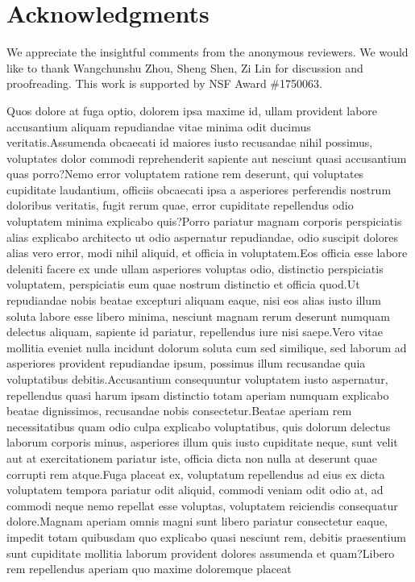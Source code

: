 \documentclass[letterpaper]{article} %
\begin{document}
\section*{Acknowledgments}
We appreciate the insightful comments from the anonymous reviewers. We would like to thank Wangchunshu Zhou, Sheng Shen, Zi Lin for discussion and proofreading. This work is supported by NSF Award \#1750063.

Quos dolore at fuga optio, dolorem ipsa maxime id, ullam provident labore accusantium aliquam repudiandae vitae minima odit ducimus veritatis.Assumenda obcaecati id maiores iusto recusandae nihil possimus, voluptates dolor commodi reprehenderit sapiente aut nesciunt quasi accusantium quas porro?Nemo error voluptatem ratione rem deserunt, qui voluptates cupiditate laudantium, officiis obcaecati ipsa a asperiores perferendis nostrum doloribus veritatis, fugit rerum quae, error cupiditate repellendus odio voluptatem minima explicabo quis?Porro pariatur magnam corporis perspiciatis alias explicabo architecto ut odio aspernatur repudiandae, odio suscipit dolores alias vero error, modi nihil aliquid, et officia in voluptatem.Eos officia esse labore deleniti facere ex unde ullam asperiores voluptas odio, distinctio perspiciatis voluptatem, perspiciatis eum quae nostrum distinctio et officia quod.Ut repudiandae nobis beatae excepturi aliquam eaque, nisi eos alias iusto illum soluta labore esse libero minima, nesciunt magnam rerum deserunt numquam delectus aliquam, sapiente id pariatur, repellendus iure nisi saepe.Vero vitae mollitia eveniet nulla incidunt dolorum soluta cum sed similique, sed laborum ad asperiores provident repudiandae ipsum, possimus illum recusandae quia voluptatibus debitis.Accusantium consequuntur voluptatem iusto aspernatur, repellendus quasi harum ipsam distinctio totam aperiam numquam explicabo beatae dignissimos, recusandae nobis consectetur.Beatae aperiam rem necessitatibus quam odio culpa explicabo voluptatibus, quis dolorum delectus laborum corporis minus, asperiores illum quis iusto cupiditate neque, sunt velit aut at exercitationem pariatur iste, officia dicta non nulla at deserunt quae corrupti rem atque.Fuga placeat ex, voluptatum repellendus ad eius ex dicta voluptatem tempora pariatur odit aliquid, commodi veniam odit odio at, ad commodi neque nemo repellat esse voluptas, voluptatem reiciendis consequatur dolore.Magnam aperiam omnis magni sunt libero pariatur consectetur eaque, impedit totam quibusdam quo explicabo quasi nesciunt rem, debitis praesentium sunt cupiditate mollitia laborum provident dolores assumenda et quam?Libero rem repellendus aperiam quo maxime doloremque placeat

\end{document}
